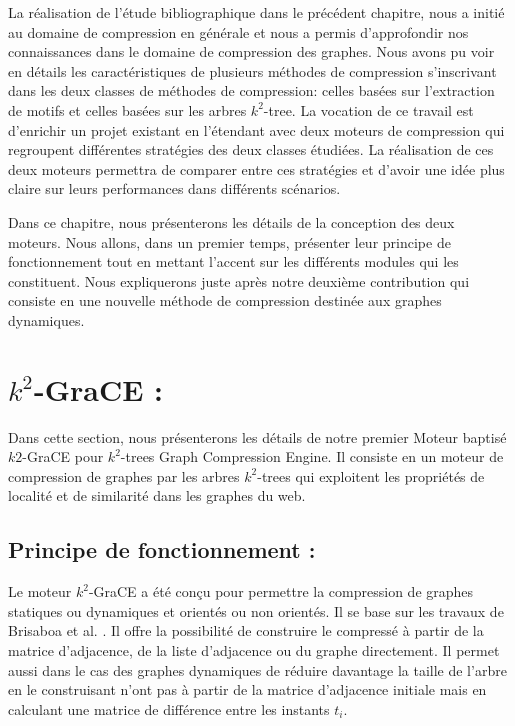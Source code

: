 \documentclass[a4paper,oneside,12pt]{report}
\theoremstyle{definition}
\begin{document}
	La réalisation de l'étude bibliographique dans le précédent chapitre, nous a initié au domaine de compression en générale et nous a permis d'approfondir nos connaissances dans le domaine de compression des graphes. Nous avons pu voir en détails les caractéristiques de plusieurs méthodes de compression s'inscrivant dans les deux classes de méthodes de compression: celles basées sur l'extraction de motifs et celles basées sur les arbres $k^2$-tree. La vocation de ce travail est d'enrichir un projet existant en l'étendant avec deux moteurs de compression qui regroupent différentes stratégies des deux classes étudiées. La réalisation de ces deux moteurs permettra de comparer entre ces stratégies et d'avoir une idée plus claire sur leurs performances dans différents scénarios.
	
	Dans ce chapitre, nous présenterons les détails de la conception des deux moteurs. Nous allons, dans un premier temps, présenter leur principe de fonctionnement tout en mettant l'accent sur les différents modules qui les constituent. Nous expliquerons juste après notre deuxième contribution qui consiste en une nouvelle  méthode de compression destinée aux graphes dynamiques.
	

	\section{$k^2$-GraCE : }
	\label{k2}

Dans cette section, nous présenterons les détails de notre premier Moteur baptisé $k2$-GraCE pour $k^2$-trees Graph Compression Engine. Il consiste en un moteur de compression de graphes par les arbres $k^2$-trees qui exploitent les propriétés de localité et de similarité dans les graphes du web. 

		\subsection{Principe de fonctionnement :}
		
	Le moteur $k^2$-GraCE a été conçu pour permettre la compression de graphes statiques ou dynamiques et orientés ou non orientés. Il se base sur les travaux de Brisaboa et al. \citep{brisaboa2009k}. Il offre la possibilité de construire le compressé à partir de la matrice d'adjacence, de la liste d'adjacence ou du graphe directement. Il permet aussi dans le cas des graphes dynamiques de réduire davantage la taille de l'arbre en le construisant n'ont pas à partir de la matrice d'adjacence initiale mais en calculant une matrice de différence entre les instants $t_i$. 
	
\end{document}
